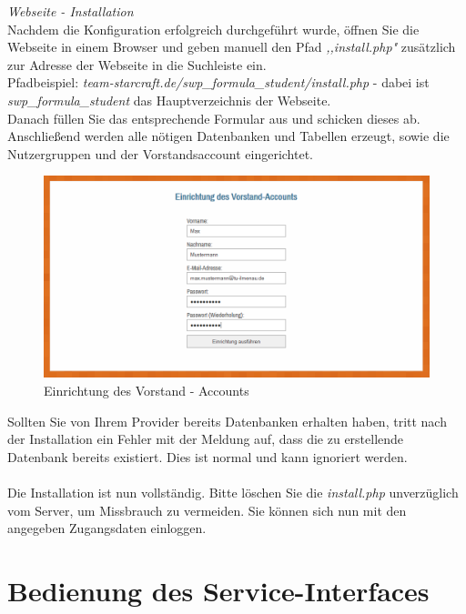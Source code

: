 \documentclass[fontsize = 12pt, paper = a4]{scrreprt}
\begin{document}
\newpage


\textit{Webseite - Installation} \\

Nachdem die Konfiguration erfolgreich durchgeführt wurde, öffnen Sie die Webseite in einem Browser und geben manuell den Pfad \textit{,,install.php"} zusätzlich zur Adresse der Webseite in die Suchleiste ein.\\
Pfadbeispiel: \textit{team-starcraft.de/swp\_formula\_student/install.php} - dabei ist \textit{swp\_formula\_student} das Hauptverzeichnis der Webseite. \\
 Danach füllen Sie das entsprechende Formular aus und schicken dieses ab. 
 Anschließend werden alle nötigen Datenbanken und Tabellen erzeugt, sowie die Nutzergruppen und der Vorstandsaccount eingerichtet.

\begin{figure}[h]
\centering
\includegraphics[scale = 0.50]{install}
\caption[Einrichtung des Vorstand - Accounts]{Einrichtung des Vorstand - Accounts}
\label{installvorstand}
\end{figure} 


Sollten Sie von Ihrem Provider bereits Datenbanken erhalten haben, tritt nach der Installation ein Fehler mit der Meldung auf, dass die zu erstellende Datenbank bereits existiert. Dies ist normal und kann ignoriert werden. \\ \\

Die Installation ist nun vollständig. Bitte löschen Sie die \textit{install.php} unverzüglich vom Server, um Missbrauch zu vermeiden. Sie können sich nun mit den angegeben Zugangsdaten einloggen.





\chapter{Bedienung des Service-Interfaces}
\end{document}
